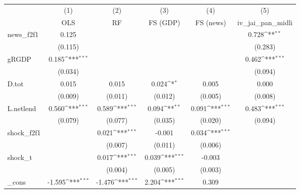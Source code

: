 {
\def\sym#1{\ifmmode^{#1}\else\(^{#1}\)\fi}
\begin{tabular}{l*{5}{c}}
\toprule
            &\multicolumn{1}{c}{(1)}&\multicolumn{1}{c}{(2)}&\multicolumn{1}{c}{(3)}&\multicolumn{1}{c}{(4)}&\multicolumn{1}{c}{(5)}\\
            &\multicolumn{1}{c}{OLS}&\multicolumn{1}{c}{RF}&\multicolumn{1}{c}{FS (GDP)}&\multicolumn{1}{c}{FS (news)}&\multicolumn{1}{c}{iv\_jai\_pan\_midli}\\
\midrule
news\_f2f1   &       0.125         &                     &                     &                     &       0.728\sym{**} \\
            &     (0.115)         &                     &                     &                     &     (0.283)         \\
\addlinespace
gRGDP       &       0.185\sym{***}&                     &                     &                     &       0.462\sym{***}\\
            &     (0.034)         &                     &                     &                     &     (0.094)         \\
\addlinespace
D.tot       &       0.015         &       0.015         &       0.024\sym{*}  &       0.005         &       0.000         \\
            &     (0.009)         &     (0.011)         &     (0.012)         &     (0.005)         &     (0.008)         \\
\addlinespace
L.netlend   &       0.560\sym{***}&       0.589\sym{***}&       0.094\sym{**} &       0.091\sym{***}&       0.483\sym{***}\\
            &     (0.079)         &     (0.077)         &     (0.035)         &     (0.020)         &     (0.094)         \\
\addlinespace
shock\_f2f1  &                     &       0.021\sym{***}&      -0.001         &       0.034\sym{***}&                     \\
            &                     &     (0.007)         &     (0.011)         &     (0.006)         &                     \\
\addlinespace
shock\_t     &                     &       0.017\sym{***}&       0.039\sym{***}&      -0.003         &                     \\
            &                     &     (0.004)         &     (0.005)         &     (0.003)         &                     \\
\addlinespace
\_cons      &      -1.595\sym{***}&      -1.476\sym{***}&       2.204\sym{***}&       0.309         &                     \\

\end{tabular}}
